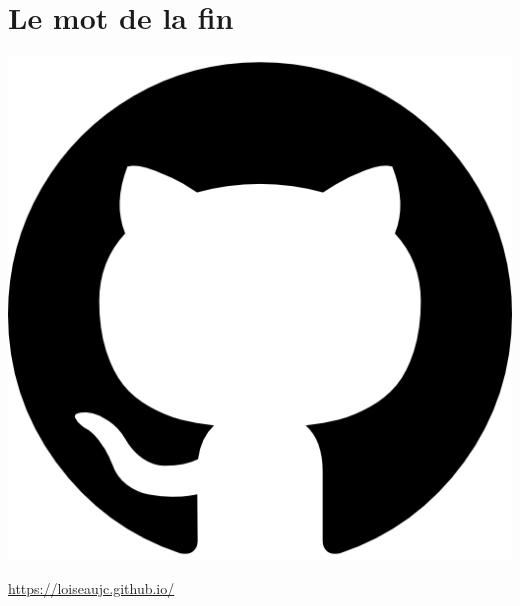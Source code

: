 \documentclass[aspectratio=169, usenames, dvipsnames]{beamer}
\begin{document}
\section{Le mot de la fin}
\begin{frame}
  \sectionpage
\end{frame}

{


  \begin{frame}
    \centering
    \vfill
    \vfill
  \end{frame}


  \begin{frame}
    \begin{minipage}{.28\textwidth}
      \centering
      \includegraphics[height=.15\textheight]{github}
    \end{minipage}%
    \hfill
    \begin{minipage}{.68\textwidth}
      \url{https://loiseaujc.github.io/}
    \end{minipage}


\end{frame}}
\end{document}

